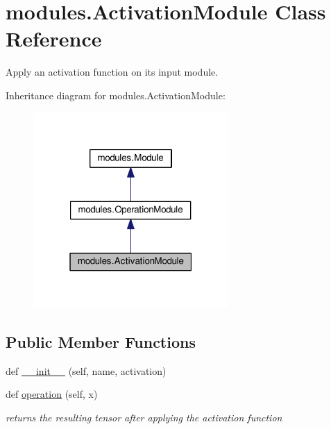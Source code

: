 \hypertarget{classmodules_1_1_activation_module}{}\section{modules.\+Activation\+Module Class Reference}
\label{classmodules_1_1_activation_module}


Apply an activation function on its input module.  




Inheritance diagram for modules.\+Activation\+Module\+:\nopagebreak
\begin{figure}[H]
\begin{center}
\leavevmode
\includegraphics[width=211pt]{classmodules_1_1_activation_module__inherit__graph}
\end{center}
\end{figure}
\subsection*{Public Member Functions}
\begin{DoxyCompactItemize}
\item 
def \hyperlink{classmodules_1_1_activation_module_a8de2b8f05ce37f9d874b4a9872dc0b5e}{\+\_\+\+\_\+init\+\_\+\+\_\+} (self, name, activation)
\item 
\mbox{\label{classmodules_1_1_activation_module_a7c4940fe0bde2e70efa8b95a79cfa4d1}} 
def \hyperlink{classmodules_1_1_activation_module_a7c4940fe0bde2e70efa8b95a79cfa4d1}{operation} (self, x)
\begin{DoxyCompactList}\small\item\em returns the resulting tensor after applying the activation function \end{DoxyCompactList}\end{DoxyCompactItemize}
